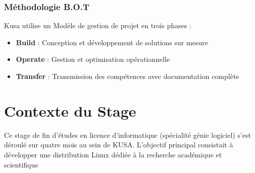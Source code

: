 \subsubsection*{Méthodologie B.O.T}
Kusa utilise un Modèle de gestion de projet en trois phases :
\begin{itemize}
    \item \textbf{Build} : Conception et développement de solutions sur mesure
    \item \textbf{Operate} : Gestion et optimisation opérationnelle
    \item \textbf{Transfer} : Transmission des compétences avec documentation complète
\end{itemize}


\section{Contexte du Stage}
\label{sec:contexte_stage}
Ce stage de fin d'études en licence d'informatique (spécialité génie logiciel) s'est déroulé sur quatre mois au sein de KUSA. L'objectif principal consistait à développer une distribution Linux dédiée à la recherche académique et scientifique

